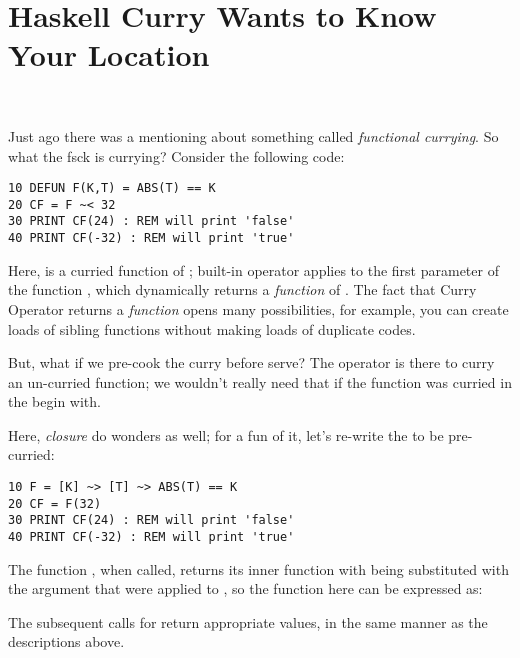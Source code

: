 \section[Currying]{Haskell Curry Wants to Know Your Location}
\label{currying101}

\vspace*{-\mytextsize}\ \par %
Just \setcounter{curryingselfref}{\value{page} - \value{curryingappearance}} ago there was a mentioning about something called \emph{functional currying}. So what the fsck is currying? Consider the following code:

\begin{lstlisting}
10 DEFUN F(K,T) = ABS(T) == K
20 CF = F ~< 32
30 PRINT CF(24) : REM will print 'false'
40 PRINT CF(-32) : REM will print 'true'
\end{lstlisting}

Here,  is a curried function of ; built-in operator \code{\basiccurry} applies  to the first parameter of the function , which dynamically returns a \emph{function} of . The fact that Curry Operator returns a \emph{function} opens many possibilities, for example, you can create loads of sibling functions without making loads of duplicate codes.

But, what if we pre-cook the curry before serve? The \code{\basiccurry} operator is there to curry an un-curried function; we wouldn't really need that if the function was curried in the begin with.

Here, \emph{closure} do wonders as well; for a fun of it, let's re-write the  to be pre-curried:

\begin{lstlisting}
10 F = [K] ~> [T] ~> ABS(T) == K
20 CF = F(32)
30 PRINT CF(24) : REM will print 'false'
40 PRINT CF(-32) : REM will print 'true'
\end{lstlisting}

The function , when called, returns its inner function  with  being substituted with the argument that were applied to , so the function  here can be expressed as: 

The subsequent calls for  return appropriate values, in the same manner as the descriptions above.

